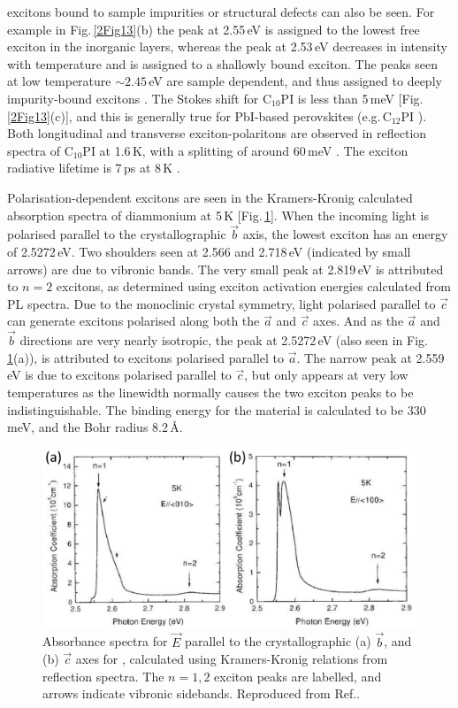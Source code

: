 excitons bound to sample impurities or structural defects %
can also be seen. For example in Fig.\,\ref{2Fig13}(b) the peak at 2.55\,eV is assigned to the lowest free exciton in the inorganic layers, whereas the peak at 2.53\,eV decreases in intensity with temperature and is assigned to a shallowly bound exciton. The peaks seen at low temperature $\sim2.45$\,eV are sample dependent, and thus assigned to deeply impurity-bound excitons \cite{Ishihara1990}. The Stokes shift for $\textrm{C}_{10}$PI is less than 5\,meV [Fig.\,\ref{2Fig13}(c)], and this is generally true for PbI-based perovskites (e.g.\,$\textrm{C}_{12}$PI \cite{Pradeesh2009}). Both longitudinal and transverse exciton-polaritons are observed in reflection spectra of $\textrm{C}_{10}$PI at 1.6\,K, with a splitting of around 60\,meV \cite{Ishihara1990, Ishihara1989}. The exciton radiative lifetime is 7\,ps at 8\,K \cite{Kondo1998a}.

Polarisation-dependent excitons are seen in the Kramers-Kronig calculated absorption spectra of diammonium  at 5\,K [Fig.\,\ref{2Fig14}]. When the incoming light is polarised parallel to the crystallographic $\vec{b}$ axis, the lowest exciton has an energy of 2.5272\,eV. Two shoulders seen at 2.566 and 2.718\,eV (indicated by small arrows) are due to vibronic bands. The very small peak at 2.819\,eV is attributed to $n=2$ excitons, as determined using exciton activation energies calculated from PL spectra. Due to the monoclinic crystal symmetry, light polarised parallel to $\vec{c}$ can generate excitons polarised along both the $\vec{a}$ and $\vec{c}$ axes. And as the $\vec{a}$ and $\vec{b}$ directions are very nearly isotropic, the peak at 2.5272\,eV (also seen in Fig.\,\ref{2Fig14}(a)), is attributed to excitons polarised parallel to $\vec{a}$. The narrow peak at 2.559\,eV is due to excitons polarised parallel to $\vec{c}$, but only appears at very low temperatures as the linewidth normally causes the two exciton peaks to be indistinguishable. The binding energy for the material is calculated to be 330\,meV, and the Bohr radius 8.2\,\AA \cite{Goto2001}.
\begin{figure} [h!]
\centering
\includegraphics[width=\textwidth]{Fig14}
\caption{Absorbance spectra for $\vec{E}$ parallel to the crystallographic (a) $\vec{b}$, and (b) $\vec{c}$ axes for , calculated using Kramers-Kronig relations from reflection spectra. The $n=1, 2$ exciton peaks are labelled, and arrows indicate vibronic sidebands. Reproduced from Ref.\!.}
\label{2Fig14}
\end{figure}

